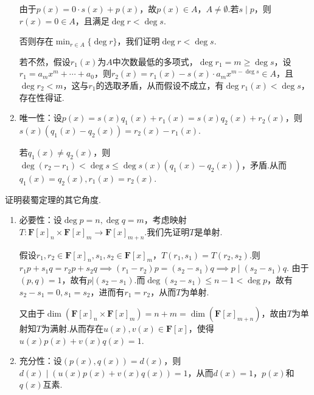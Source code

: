 \begin{exercise}
\begin{exgroup}
\begin{answer}
\begin{enumerate}
                由于$p(x)=0\cdot s(x)+p(x)$，故$p(x)\in A$，$A\neq \emptyset$.若$s\mid p$，则$r(x)=0\in A$，且满足$\deg r<\deg s$.

                否则存在$\displaystyle \min_{r\in A}\{\deg r\}$，我们证明$\deg r<\deg s$.

                若不然，假设$r_1(x)$为$A$中次数最低的多项式，$\deg r_1=m\geqslant \deg s$，设$r_1=a_mx^m+\cdots+a_0$，则$r_2(x)=r_1(x)-s(x)\cdot a_mx^{m-\deg s}\in A$，且$\deg r_2 <m$，这与$r_1$的选取矛盾，从而假设不成立，有$\deg r_1(x)<\deg s$，存在性得证.
                \item 唯一性：设$p(x)=s(x)q_1(x)+r_1(x)=s(x)q_2(x)+r_2(x)$，则$s(x)(q_1(x)-q_2(x))=r_2(x)-r_1(x)$.

                若$q_1(x)\neq q_2(x)$，则$\deg (r_2-r_1)<\deg s\leqslant \deg s(x)(q_1(x)-q_2(x))$，矛盾.从而$q_1(x)=q_2(x),r_1(x)=r_2(x)$.
            \end{enumerate}
        \end{answer}
        \item 证明裴蜀定理的其它角度.
        \begin{answer}
            \begin{enumerate}
                \item 必要性：设$\deg p=n,\deg q=m$，考虑映射$T:\mathbf{F}[x]_{n}\times\mathbf{F}[x]_{m}\rightarrow \mathbf{F}[x]_{m+n}$.我们先证明$T$是单射.

                假设$r_1,r_2\in\mathbf{F}[x]_{n},s_1,s_2\in\mathbf{F}[x]_{m}$，$T(r_1,s_1)=T(r_2,s_2)$.则$r_1p+s_1q=r_2p+s_2q \implies (r_1-r_2)p=(s_2-s_1)q\implies p\mid(s_2-s_1)q$.
                由于$(p,q)=1$，故有$p|(s_2-s_1)$.而$\deg (s_2-s_1)\leqslant n-1 <\deg p$，故有$s_2-s_1=0,s_1=s_2$，进而有$r_1=r_2$，从而$T$为单射.

                又由于$\dim(\mathbf{F}[x]_{n}\times\mathbf{F}[x]_{m})=n+m=\dim(\mathbf{F}[x]_{m+n})$，故由$T$为单射知$T$为满射.从而存在$u(x),v(x)\in\mathbf{F}[x]$，使得$u(x)p(x)+v(x)q(x)=1$.
                \item 充分性：设$(p(x),q(x))=d(x)$，则$d(x)\mid (u(x)p(x)+v(x)q(x))=1$，从而$d(x)=1$，$p(x)$和$q(x)$互素.
            \end{enumerate}
        \end{answer}
    \end{exgroup}
\end{exercise}

